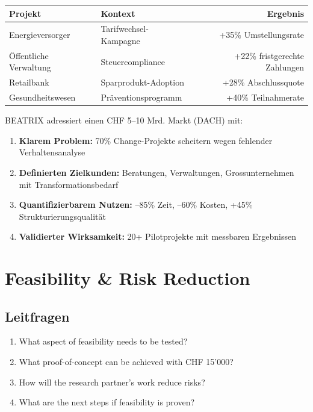 \documentclass[11pt,a4paper]{article}
\begin{document}
\begin{table}[h]
\centering
\begin{tabularx}{\textwidth}{lXr}
\toprule
\textbf{Projekt} & \textbf{Kontext} & \textbf{Ergebnis} \\
\midrule
Energieversorger & Tarifwechsel-Kampagne & +35\% Umstellungsrate \\
Öffentliche Verwaltung & Steuercompliance & +22\% fristgerechte Zahlungen \\
Retailbank & Sparprodukt-Adoption & +28\% Abschlussquote \\
Gesundheitswesen & Präventionsprogramm & +40\% Teilnahmerate \\
\bottomrule
\end{tabularx}
\end{table}

\begin{summarybox}
BEATRIX adressiert einen CHF 5--10 Mrd. Markt (DACH) mit:
\begin{enumerate}
    \item \textbf{Klarem Problem:} 70\% Change-Projekte scheitern wegen fehlender Verhaltensanalyse
    \item \textbf{Definierten Zielkunden:} Beratungen, Verwaltungen, Grossunternehmen mit Transformationsbedarf
    \item \textbf{Quantifizierbarem Nutzen:} --85\% Zeit, --60\% Kosten, +45\% Strukturierungsqualität
    \item \textbf{Validierter Wirksamkeit:} 20+ Pilotprojekte mit messbaren Ergebnissen
\end{enumerate}
\end{summarybox}

\newpage

\section{Feasibility \& Risk Reduction}

\subsection{Leitfragen}

\begin{enumerate}
    \item What aspect of feasibility needs to be tested?
    \item What proof-of-concept can be achieved with CHF 15'000?
    \item How will the research partner's work reduce risks?
    \item What are the next steps if feasibility is proven?
\end{enumerate}
\end{document}
